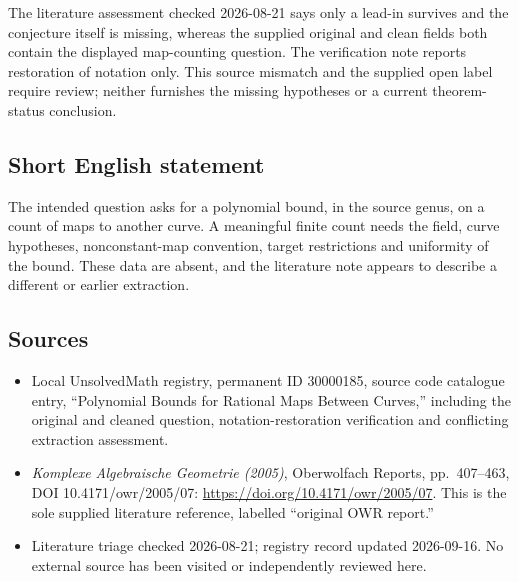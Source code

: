 \documentclass[11pt]{article}
\begin{document}
The literature assessment checked 2026-08-21 says only a lead-in survives and the conjecture itself is missing, whereas the supplied original and clean fields both contain the displayed map-counting question. The verification note reports restoration of notation only. This source mismatch and the supplied open label require review; neither furnishes the missing hypotheses or a current theorem-status conclusion.
\subsection{Short English statement}
The intended question asks for a polynomial bound, in the source genus, on a count of maps to another curve. A meaningful finite count needs the field, curve hypotheses, nonconstant-map convention, target restrictions and uniformity of the bound. These data are absent, and the literature note appears to describe a different or earlier extraction.
\subsection{Sources}
\begin{itemize}
\item Local UnsolvedMath registry, permanent ID 30000185, source code catalogue entry, ``Polynomial Bounds for Rational Maps Between Curves,'' including the original and cleaned question, notation-restoration verification and conflicting extraction assessment.
\item \emph{Komplexe Algebraische Geometrie (2005)}, Oberwolfach Reports, pp.\ 407--463, DOI 10.4171/owr/2005/07: \url{https://doi.org/10.4171/owr/2005/07}. This is the sole supplied literature reference, labelled ``original OWR report.''
\item Literature triage checked 2026-08-21; registry record updated 2026-09-16. No external source has been visited or independently reviewed here.
\end{itemize}
\end{document}
